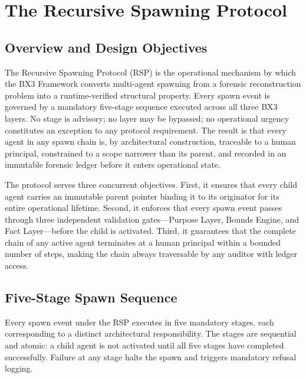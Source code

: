 \section{The Recursive Spawning Protocol}\label{sec:rs-protocol}

\subsection{Overview and Design Objectives}

The Recursive Spawning Protocol (RSP) is the operational mechanism by which the BX3 Framework converts multi-agent spawning from a forensic reconstruction problem into a runtime-verified structural property. Every spawn event is governed by a mandatory five-stage sequence executed across all three BX3 layers. No stage is advisory; no layer may be bypassed; no operational urgency constitutes an exception to any protocol requirement. The result is that every agent in any spawn chain is, by architectural construction, traceable to a human principal, constrained to a scope narrower than its parent, and recorded in an immutable forensic ledger before it enters operational state.

The protocol serves three concurrent objectives. First, it ensures that every child agent carries an immutable parent pointer binding it to its originator for its entire operational lifetime. Second, it enforces that every spawn event passes through three independent validation gates—Purpose Layer, Bounds Engine, and Fact Layer—before the child is activated. Third, it guarantees that the complete chain of any active agent terminates at a human principal within a bounded number of steps, making the chain always traversable by any auditor with ledger access.

\subsection{Five-Stage Spawn Sequence}

Every spawn event under the RSP executes in five mandatory stages, each corresponding to a distinct architectural responsibility. The stages are sequential and atomic: a child agent is not activated until all five stages have completed successfully. Failure at any stage halts the spawn and triggers mandatory refusal logging.

